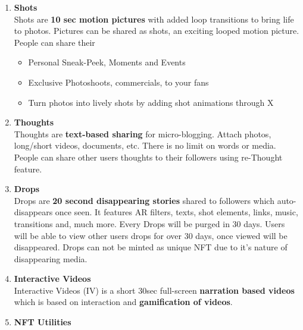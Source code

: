 \documentclass[letterpaper,11pt]{article}
\begin{document}
\begin{enumerate}[wide, labelwidth=!, labelindent=0pt]
\item \textbf{Shots}\\

Shots are \textbf{10 sec motion pictures} with added loop transitions to bring life to photos. Pictures can be shared as shots, an exciting looped motion picture.\\
People can share their
\begin{itemize}[wide, labelwidth=!, labelindent=0pt]
\item Personal Sneak-Peek, Moments and Events
\item Exclusive Photoshoots, commercials, to your fans
\item Turn photos into lively shots by adding shot animations through X
\end{itemize}



\item \textbf{Thoughts}\\

Thoughts are \textbf{text-based sharing} for micro-blogging. Attach photos, long/short videos, documents, etc. There is no limit on words or media. People can share other users thoughts to their followers using re-Thought feature.\\

\item \textbf{Drops}\\

Drops are \textbf{20 second disappearing stories} shared to followers which auto-disappears once seen. It features AR filters, texts, shot elements, links, music, transitions and, much more. Every Drops will be purged in 30 days. Users will be able to view other users drops for over 30 days, once viewed will be disappeared. Drops can not be minted as unique NFT due to it's nature of disappearing media.\\

\item \textbf{Interactive Videos}\\


Interactive Videos (IV) is a short 30sec full-screen \textbf{narration based videos} which is based on interaction and \textbf{gamification of videos}.\\


\item \textbf{NFT Utilities}\\



\end{enumerate}
\end{document}
